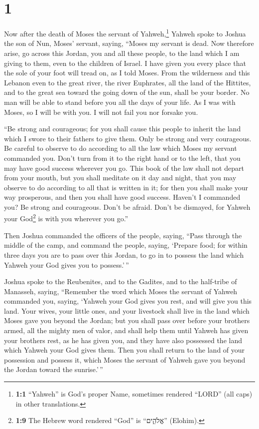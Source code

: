 \hypertarget{section}{%
\section{1}\label{section}}

 Now after the death of Moses the servant of
Yahweh,\footnote{\textbf{1:1} ``Yahweh'' is God's proper Name, sometimes
  rendered ``LORD'' (all caps) in other translations.} Yahweh spoke to
Joshua the son of Nun, Moses' servant, saying,  ``Moses my
servant is dead. Now therefore arise, go across this Jordan, you and all
these people, to the land which I am giving to them, even to the
children of Israel.  I have given you every place that the
sole of your foot will tread on, as I told Moses.  From
the wilderness and this Lebanon even to the great river, the river
Euphrates, all the land of the Hittites, and to the great sea toward the
going down of the sun, shall be your border.  No man will
be able to stand before you all the days of your life. As I was with
Moses, so I will be with you. I will not fail you nor forsake you.

 ``Be strong and courageous; for you shall cause this
people to inherit the land which I swore to their fathers to give them.
 Only be strong and very courageous. Be careful to observe
to do according to all the law which Moses my servant commanded you.
Don't turn from it to the right hand or to the left, that you may have
good success wherever you go.  This book of the law shall
not depart from your mouth, but you shall meditate on it day and night,
that you may observe to do according to all that is written in it; for
then you shall make your way prosperous, and then you shall have good
success.  Haven't I commanded you? Be strong and
courageous. Don't be afraid. Don't be dismayed, for Yahweh your
God\footnote{\textbf{1:9} The Hebrew word rendered ``God'' is
  ``אֱלֹהִ֑ים'' (Elohim).} is with you wherever you go.''

 Then Joshua commanded the officers of the people,
saying,  ``Pass through the middle of the camp, and
command the people, saying, `Prepare food; for within three days you are
to pass over this Jordan, to go in to possess the land which Yahweh your
God gives you to possess.'\,''

 Joshua spoke to the Reubenites, and to the Gadites, and
to the half-tribe of Manasseh, saying,  ``Remember the
word which Moses the servant of Yahweh commanded you, saying, `Yahweh
your God gives you rest, and will give you this land. 
Your wives, your little ones, and your livestock shall live in the land
which Moses gave you beyond the Jordan; but you shall pass over before
your brothers armed, all the mighty men of valor, and shall help them
 until Yahweh has given your brothers rest, as he has
given you, and they have also possessed the land which Yahweh your God
gives them. Then you shall return to the land of your possession and
possess it, which Moses the servant of Yahweh gave you beyond the Jordan
toward the sunrise.'\,''


